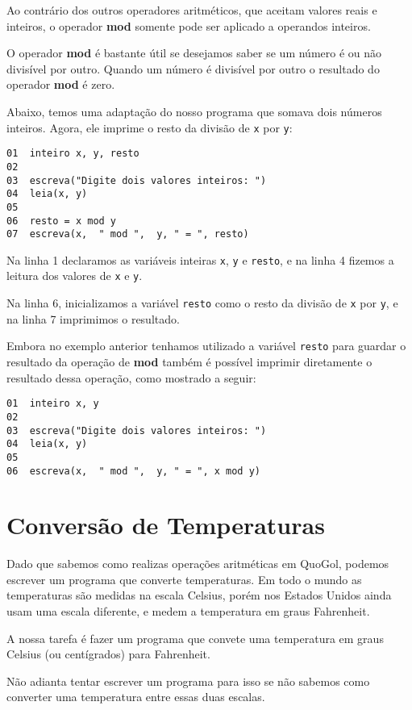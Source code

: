 \documentclass{report}
\newcommand{\Qgol}{QuoGol\;}
\begin{document}
Ao contrário dos outros operadores aritméticos, que aceitam
valores reais e inteiros, o operador \textbf{mod} somente pode
ser aplicado a operandos inteiros. 

O operador \textbf{mod} é bastante útil se desejamos saber se
um número é ou não divisível por outro. Quando um número é divisível
por outro o resultado do operador \textbf{mod} é zero.

Abaixo, temos uma adaptação do nosso programa que somava dois números
inteiros. Agora, ele imprime o resto da divisão de \texttt{x} por \texttt{y}:
%
\begin{verbatim}
01  inteiro x, y, resto
02  
03  escreva("Digite dois valores inteiros: ")
04  leia(x, y)
05 
06  resto = x mod y
07  escreva(x,  " mod ",  y, " = ", resto)
\end{verbatim}

Na linha 1 declaramos as variáveis inteiras
\texttt{x}, \texttt{y} e \texttt{resto}, e na
linha 4 fizemos a leitura dos valores de
\texttt{x} e \texttt{y}.

Na linha 6, inicializamos a variável \texttt{resto}
como o resto da divisão de \texttt{x} por \texttt{y},
e na linha 7 imprimimos o resultado.


Embora no exemplo anterior tenhamos utilizado a variável
\texttt{resto} para guardar o resultado da operação de \textbf{mod}
também é possível imprimir diretamente o resultado dessa operação,
como mostrado a seguir:
\begin{verbatim}
01  inteiro x, y
02  
03  escreva("Digite dois valores inteiros: ")
04  leia(x, y)
05 
06  escreva(x,  " mod ",  y, " = ", x mod y)
\end{verbatim}


\section{Conversão de Temperaturas}

Dado que sabemos como realizas operações aritméticas em \Qgol,
podemos escrever um programa que converte temperaturas. Em todo o
mundo as temperaturas são medidas na escala Celsius, porém nos
Estados Unidos ainda usam uma escala diferente, e medem a temperatura
em graus Fahrenheit. 

A nossa tarefa é fazer um programa que convete uma temperatura em
graus Celsius (ou centígrados) para Fahrenheit.

Não adianta tentar escrever um programa para isso se não sabemos
como converter uma temperatura entre essas duas escalas.
\end{document}
